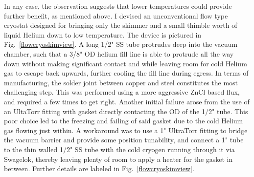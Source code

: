 
In any case, the observation suggests that lower temperatures could provide further benefit, as mentioned above.
I devised an unconventional flow type cryostat designed for bringing only the skimmer and a small thimble worth of liquid Helium down to low temperature.
The device is pictured in Fig.~\ref{flowcryoskimview}.
A long 1/2" SS tube protrudes deep into the vacuum chamber, such that a 3/8" OD helium fill line is able to protrude all the way down without making significant contact and while leaving room for cold Helium gas to escape back upwards, further cooling the fill line during egress.
In terms of manufacturing, the solder joint between copper and steel constitutes the most challenging step.
This was performed using a more aggressive ZnCl based flux, and required a few times to get right.
Another initial failure arose from the use of an UltaTorr fitting with gasket directly contacting the OD of the 1/2" tube.
This poor choice led to the freezing and failing of said gasket due to the cold Helium gas flowing just within.
A workaround was to use a 1" UltraTorr fitting to bridge the vacuum barrier and provide some position tunability, and connect a 1" tube to the thin walled 1/2" SS tube with the cold cryogen running through it via Swagelok, thereby leaving plenty of room to apply a heater for the gasket in between.
Further details are labeled in Fig.~\ref{flowcryoskimview}.

